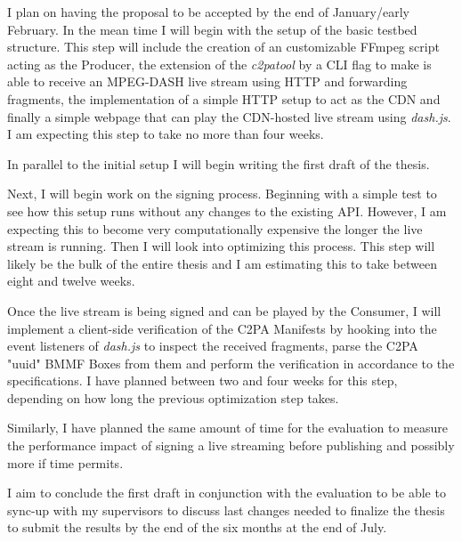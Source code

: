 \documentclass[a4paper]{article}
\begin{document}
I plan on having the proposal to be accepted by the end of January/early February. In the mean time I will begin with the setup of the basic testbed structure. This step will include the creation of an customizable FFmpeg script acting as the Producer, the extension of the \textit{c2patool} by a CLI flag to make is able to receive an MPEG-DASH live stream using HTTP and forwarding fragments, the implementation of a simple HTTP setup to act as the CDN and finally a simple webpage that can play the CDN-hosted live stream using \textit{dash.js}. I am expecting this step to take no more than four weeks.

In parallel to the initial setup I will begin writing the first draft of the thesis.

Next, I will begin work on the signing process. Beginning with a simple test to see how this setup runs without any changes to the existing API. However, I am expecting this to become very computationally expensive the longer the live stream is running. Then I will look into optimizing this process. This step will likely be the bulk of the entire thesis and I am estimating this to take between eight and twelve weeks.

Once the live stream is being signed and can be played by the Consumer, I will implement a client-side verification of the C2PA Manifests by hooking into the event listeners of \textit{dash.js} to inspect the received fragments, parse the C2PA "uuid" BMMF Boxes from them and perform the verification in accordance to the specifications. I have planned between two and four weeks for this step, depending on how long the previous optimization step takes.

Similarly, I have planned the same amount of time for the evaluation to measure the performance impact of signing a live streaming before publishing and possibly more if time permits.

I aim to conclude the first draft in conjunction with the evaluation to be able to sync-up with my supervisors to discuss last changes needed to finalize the thesis to submit the results by the end of the six months at the end of July.
\end{document}
